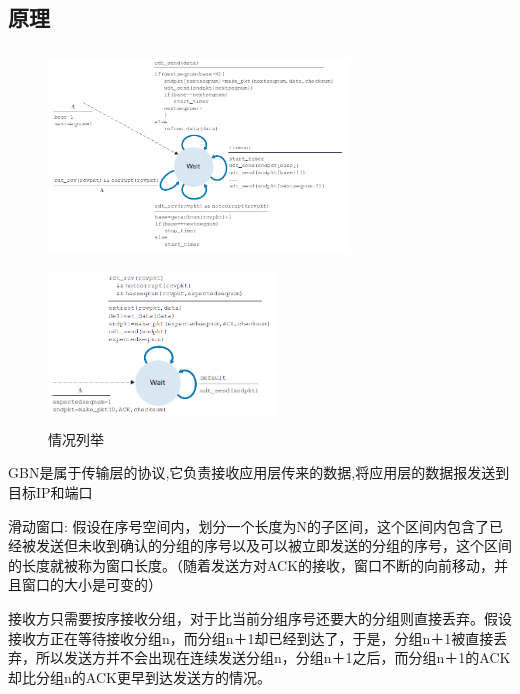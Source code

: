 \documentclass[UTF8,14pt]{article}
\numberwithin{figure}{section}
\begin{document}
\subsection{原理}
\vspace{-0.5cm}
\begin{figure}[!htbp]
      \centering
      \begin{minipage}[!ht]{0.59\textwidth}
            \centering
            \includegraphics[width=8cm,height=5.5cm]{gbn1.png}
      \end{minipage}
      \begin{minipage}[!ht]{0.39\textwidth}
            \centering
            \includegraphics[width=6cm,height=4.3cm]{gbn2.png}
      \end{minipage}
      \caption{情况列举}
\end{figure}

GBN是属于传输层的协议,它负责接收应用层传来的数据,将应用层的数据报发送到目标IP和端口

滑动窗口: 假设在序号空间内，划分一个长度为N的子区间，这个区间内包含了已经被发送但未收到确认的分组的序号以及可以被立即发送的分组的序号，这个区间的长度就被称为窗口长度。（随着发送方对ACK的接收，窗口不断的向前移动，并且窗口的大小是可变的）

接收方只需要按序接收分组，对于比当前分组序号还要大的分组则直接丢弃。假设接收方正在等待接收分组n，而分组n＋1却已经到达了，于是，分组n＋1被直接丢弃，所以发送方并不会出现在连续发送分组n，分组n＋1之后，而分组n＋1的ACK却比分组n的ACK更早到达发送方的情况。
\end{document}
